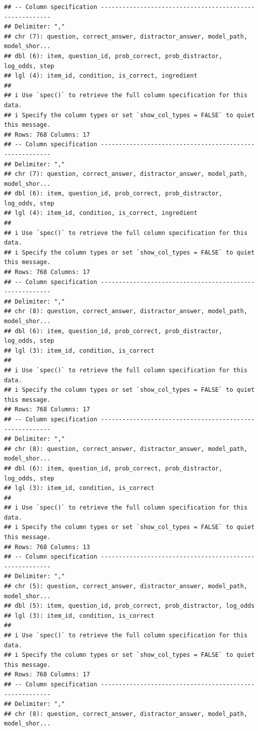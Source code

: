 \documentclass[
]{article}
\begin{document}
\begin{verbatim}
## -- Column specification --------------------------------------------------------
## Delimiter: ","
## chr (7): question, correct_answer, distractor_answer, model_path, model_shor...
## dbl (6): item, question_id, prob_correct, prob_distractor, log_odds, step
## lgl (4): item_id, condition, is_correct, ingredient
## 
## i Use `spec()` to retrieve the full column specification for this data.
## i Specify the column types or set `show_col_types = FALSE` to quiet this message.
## Rows: 768 Columns: 17
## -- Column specification --------------------------------------------------------
## Delimiter: ","
## chr (7): question, correct_answer, distractor_answer, model_path, model_shor...
## dbl (6): item, question_id, prob_correct, prob_distractor, log_odds, step
## lgl (4): item_id, condition, is_correct, ingredient
## 
## i Use `spec()` to retrieve the full column specification for this data.
## i Specify the column types or set `show_col_types = FALSE` to quiet this message.
## Rows: 768 Columns: 17
## -- Column specification --------------------------------------------------------
## Delimiter: ","
## chr (8): question, correct_answer, distractor_answer, model_path, model_shor...
## dbl (6): item, question_id, prob_correct, prob_distractor, log_odds, step
## lgl (3): item_id, condition, is_correct
## 
## i Use `spec()` to retrieve the full column specification for this data.
## i Specify the column types or set `show_col_types = FALSE` to quiet this message.
## Rows: 768 Columns: 17
## -- Column specification --------------------------------------------------------
## Delimiter: ","
## chr (8): question, correct_answer, distractor_answer, model_path, model_shor...
## dbl (6): item, question_id, prob_correct, prob_distractor, log_odds, step
## lgl (3): item_id, condition, is_correct
## 
## i Use `spec()` to retrieve the full column specification for this data.
## i Specify the column types or set `show_col_types = FALSE` to quiet this message.
## Rows: 768 Columns: 13
## -- Column specification --------------------------------------------------------
## Delimiter: ","
## chr (5): question, correct_answer, distractor_answer, model_path, model_shor...
## dbl (5): item, question_id, prob_correct, prob_distractor, log_odds
## lgl (3): item_id, condition, is_correct
## 
## i Use `spec()` to retrieve the full column specification for this data.
## i Specify the column types or set `show_col_types = FALSE` to quiet this message.
## Rows: 768 Columns: 17
## -- Column specification --------------------------------------------------------
## Delimiter: ","
## chr (8): question, correct_answer, distractor_answer, model_path, model_shor...

\end{verbatim}
\end{document}
